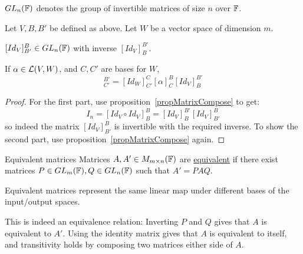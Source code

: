 \documentclass[../Main.tex]{subfiles}
\begin{document}
$GL_n(\mathbb{F})$ denotes the group of invertible matrices of size $n$ over $\mathbb{F}$.
\begin{propositions}{
        Let $V, B, B'$ be defined as above. Let $W$ be a vector space of dimension $m$.
        \label{propsChangeOfBasis}
    }
    \item $[Id_V]_{B'}^B \in GL_n(\mathbb{F})$ with inverse $[Id_V]_B^{B'}$. \label{propCOBInverse}
    \item If $\alpha \in \mathcal{L}(V, W)$, and $C, C'$ are bases for $W$,
        \begin{equation*}
            [\alpha]_{C'}^{B'} = [Id_W]_{C'}^C [\alpha]_C^B [Id_V]_B^{B'}
        \end{equation*}
\end{propositions}
\begin{proof}
    For the first part, use proposition~\ref{propMatrixCompose} to get:
    \begin{equation*}
        I_n = [Id_V \circ Id_V]_B^B = [Id_V]_B^{B'} [Id_V]_{B'}^B
    \end{equation*}
    so indeed the matrix $[Id_V]_{B'}^B$ is invertible with the required inverse. To show the second part, use proposition~\ref{propMatrixCompose} again.
\end{proof}
\begin{definition}{Equivalent matrices}
    Matrices $A, A' \in M_{m \times n}(\mathbb{F})$ are \underline{equivalent} if there exist matrices $P \in GL_m(\mathbb{F}), Q \in GL_n(\mathbb{F})$ such that $A' = PAQ$.
\end{definition}
\begin{remarks}
    \item Equivalent matrices represent the same linear map under different bases of the input/output spaces.
    \item This is indeed an equivalence relation: Inverting $P$ and $Q$ gives that $A$ is equivalent to $A'$. Using the identity matrix gives that $A$ is equivalent to itself, and transitivity holds by composing two matrices either side of $A$.
\end{remarks}
\end{document}
